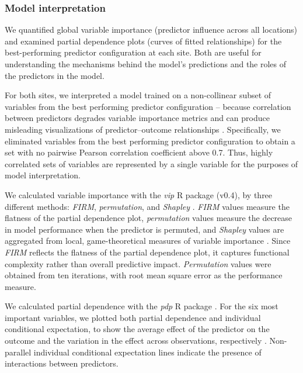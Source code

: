 \documentclass[soil, manuscript]{copernicus}
\begin{document}
\subsubsection{Model interpretation}

We quantified global variable importance (predictor influence across all locations) and examined partial dependence plots (curves of fitted relationships) for the best-performing predictor configuration at each site.
Both are useful for understanding the mechanisms behind the model's predictions and the roles of the predictors in the model.

For both sites, we interpreted a model trained on a non-collinear subset of variables from the best performing predictor configuration -- because correlation between predictors degrades variable importance metrics \citep{stroblConditionalVariableImportance2008, biauRandomForestGuided2016} and can produce misleading visualizations of predictor--outcome relationships \citep{biecekExplanatoryModelAnalysis2021, dwivediExplainableAIXAI2023}.
Specifically, we eliminated variables from the best performing predictor configuration to obtain a set with no pairwise Pearson correlation coefficient above 0.7.
Thus, highly correlated sets of variables are represented by a single variable for the purposes of model interpretation.

We calculated variable importance with the \emph{vip} R package (v0.4), by three different methods: \emph{FIRM}, \emph{permutation}, and \emph{Shapley} \citep{greenwellVariableImportancePlots2020}.
\emph{FIRM} values measure the flatness of the partial dependence plot, \emph{permutation} values measure the decrease in model performance when the predictor is permuted, and \emph{Shapley} values are aggregated from local, game-theoretical measures of variable importance \citep{greenwellVariableImportancePlots2020}.
Since \emph{FIRM} reflects the flatness of the partial dependence plot, it captures functional complexity rather than overall predictive impact.
\emph{Permutation} values were obtained from ten iterations, with root mean square error as the performance measure.

We calculated partial dependence with the \emph{pdp} R package \citep[v0.8,][]{greenwellPdpPackageConstructing2017}.
For the six most important variables, we plotted both partial dependence and individual conditional expectation, to show the average effect of the predictor on the outcome and the variation in the effect across observations, respectively \citep{goldsteinPeekingBlackBox2015}.
Non-parallel individual conditional expectation lines indicate the presence of interactions between predictors.
\end{document}
